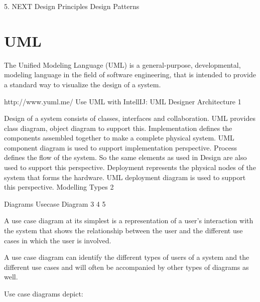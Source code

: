 5. NEXT
Design Principles
Design Patterns

\section{UML}

The Unified Modeling Language (UML) is a general-purpose, developmental, modeling language in the field of software engineering, that is intended to provide a standard way to visualize the design of a system.

http://www.yuml.me/
Use UML with IntellIJ: UML Designer
Architecture
1



Design of a system consists of classes, interfaces and collaboration. UML provides class diagram, object diagram to support this.
Implementation defines the components assembled together to make a complete physical system. UML component diagram is used to support implementation perspective.
Process defines the flow of the system. So the same elements as used in Design are also used to support this perspective.
Deployment represents the physical nodes of the system that forms the hardware. UML deployment diagram is used to support this perspective.
Modelling Types
2



Diagrams
Usecase Diagram
3 4 5

A use case diagram at its simplest is a representation of a user's interaction with the system that shows the relationship between the user and the different use cases in which the user is involved.

A use case diagram can identify the different types of users of a system and the different use cases and will often be accompanied by other types of diagrams as well.




Use case diagrams depict:

